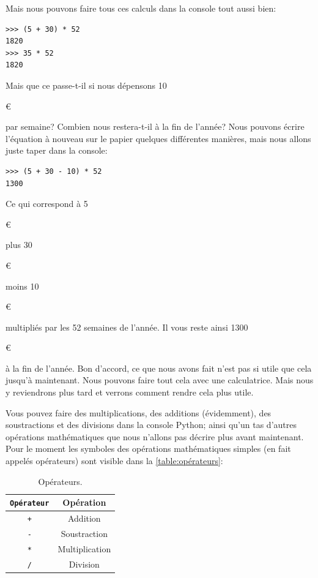 Mais nous pouvons faire tous ces calculs dans la console tout aussi bien:

\begin{Verbatim}[frame=single,rulecolor=\color{mbleu}, label=à taper]
>>> (5 + 30) * 52
1820
>>> 35 * 52
1820
\end{Verbatim}


Mais que ce passe-t-il si nous dépensons 10\begin{small}\euro\end{small} par semaine? Combien nous restera-t-il à la fin de l'année? Nous pouvons écrire l'équation à nouveau sur le papier quelques différentes manières, mais nous allons juste taper dans la console:

\begin{Verbatim}[frame=single,rulecolor=\color{mbleu}, label=à taper]
>>> (5 + 30 - 10) * 52
1300
\end{Verbatim}


Ce qui correspond à 5\begin{small}\euro\end{small} plus 30\begin{small}\euro\end{small} moins 10\begin{small}\euro\end{small} multipliés par les 52 semaines de l'année. Il vous reste ainsi 1300\begin{small}\euro\end{small} à la fin de l'année. Bon d'accord, ce que nous avons fait n'est pas si utile que cela jusqu'à maintenant. Nous pouvons faire tout cela avec une calculatrice. Mais nous y reviendrons plus tard et verrons comment rendre cela plus utile.

Vous pouvez faire des multiplications, des additions (évidemment), des soustractions et des divisions dans la console Python; ainsi qu'un tas d'autres opérations mathématiques que nous n'allons pas décrire plus avant maintenant. Pour le moment les symboles des opérations mathématiques simples (en fait appelés opérateurs)  sont visible dans la  \autoref{table:opérateurs}:


\begin{table}[h!]
\begin{center}
\begin{tabular}{|c|c|}
\hline
\texttt{Opérateur}&Opération\\
\hline
\texttt{+}&Addition\\
\hline
\texttt{-}&Soustraction\\
\hline
\texttt{*}&Multiplication\\
\hline
\texttt{/}&Division\\
\hline
\end{tabular}
\end{center}

\caption{Opérateurs.}\label{table:opérateurs}
\end{table}

